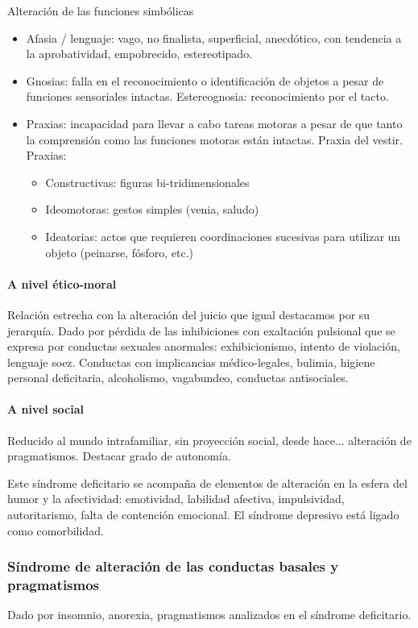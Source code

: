 Alteración de las funciones simbólicas
\begin{itemize}
	\item Afasia / lenguaje: vago, no finalista, superficial, anecdótico, con tendencia a la aprobatividad, empobrecido, estereotipado.
	\item Gnosias: falla en el reconocimiento o identificación de objetos a pesar de funciones sensoriales intactas. Estereognosia: reconocimiento por el tacto.
	\item Praxias: incapacidad para llevar a cabo tareas motoras a pesar de que tanto la comprensión como las funciones motoras están intactas. Praxia del vestir. Praxias:
	\begin{itemize}
		\item Constructivas: figuras bi-tridimensionales
		\item Ideomotoras: gestos simples (venia, saludo)
		\item Ideatorias: actos que requieren coordinaciones sucesivas para utilizar un objeto (peinarse, fósforo, etc.)
	\end{itemize}
\end{itemize}
\paragraph{A nivel ético-moral}
Relación estrecha con la alteración del juicio que igual destacamos por su jerarquía. Dado por pérdida de las inhibiciones con exaltación pulsional que se expresa por conductas sexuales anormales: exhibicionismo, intento de violación, lenguaje soez. Conductas con implicancias médico-legales, bulimia, higiene personal deficitaria, alcoholismo, vagabundeo, conductas antisociales.
\paragraph{A nivel social}
Reducido al mundo intrafamiliar, sin proyección social, desde hace... alteración de pragmatismos. Destacar grado de autonomía. 

Este síndrome deficitario se acompaña de elementos de alteración en la esfera del humor y la afectividad: emotividad, labilidad afectiva, impulsividad, autoritarismo, falta de contención emocional. El síndrome depresivo está ligado como comorbilidad.
\subsubsection*{Síndrome de alteración de las conductas basales y pragmatismos}
Dado por insomnio, anorexia, pragmatismos analizados en el síndrome deficitario.

